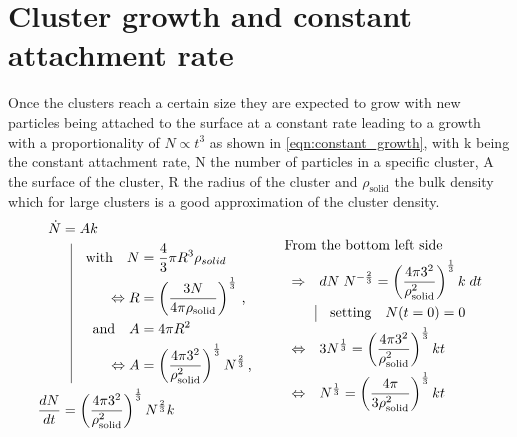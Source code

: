 \section{Cluster growth and constant attachment rate}
\label{sec:cluster_growth}
Once the clusters reach a certain size they are expected to grow with new particles being attached to the surface at a constant rate leading to a growth with a proportionality of $N \propto t^3$ as shown in \autoref{eqn:constant_growth}, with k being the constant attachment rate, N the number of particles in a specific cluster, A the surface of the cluster, R the radius of the cluster and $\rho_{\text{solid}}$ the bulk density which for large clusters is a good approximation of the cluster density.\\
\begin{align}
\label{eqn:constant_growth}  
\begin{split}
\dot{N} &= A k \\
          & \; \; \, \vrule
  \begin{aligned}[t]
    \quad \text{with}  \quad  N &= \frac{4}{3} \pi R^3 \rho_{solid}\\
    \Leftrightarrow R &= \left( \frac{3 N }{4 \pi \rho_{\text{solid}} }\right)^{\frac{1}{3}} \, \text{,} \\
    \quad \text{and}   \quad A &= 4 \pi R^2 \\
    \Leftrightarrow A &= \left(\frac{4 \pi 3^2 }{\rho_{\text{solid}}^2} \right)^\frac{1}{3} N^\frac{2}{3} \, \text{,}\\
  \end{aligned}\\
\frac{dN}{dt} &= \left(\frac{4 \pi 3^2 }{\rho_{\text{solid}}^2} \right)^\frac{1}{3}  N^\frac{2}{3} k \\
\end{split}
\hspace{1cm}
\begin{split}
& \!\!\!\!\!\!\!\!\! \text{From the bottom left side}\\
\Rightarrow& \quad dN \; N^{-\frac{2}{3}} = \left(\frac{4 \pi 3^2 }{\rho_{\text{solid}}^2} \right)^\frac{1}{3} k \; dt\\
          & \; \; \, \vrule
  \begin{aligned}[t]
    \quad \text{setting}  \quad  N(t=0) = 0\\
  \end{aligned}\\
\Leftrightarrow& \quad 3 N^{\frac{1}{3}} = \left(\frac{4 \pi 3^2 }{\rho_{\text{solid}}^2} \right)^\frac{1}{3} k t\\
\Leftrightarrow&  \quad N^{\frac{1}{3}} = \left( \frac{4 \pi}{3 \rho_{\text{solid}}^2} \right)^\frac{1}{3} k t
\end{split}
\end{align}  


